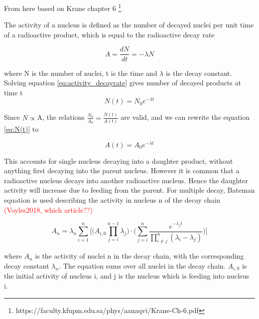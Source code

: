 \documentclass[a4paper,11pt,twoside]{book}
\begin{document}
From here based on Krane chapter 6 \footnote{https://faculty.kfupm.edu.sa/phys/aanaqvi/Krane-Ch-6.pdf}

The activity of a nucleus is defined as the number of decayed nuclei per unit time of a radioactive product, which is equal to the radioactive decay rate 

\begin{equation} \label{eq:activity_decayrate}
   A =  \frac{dN}{dt}=-\lambda N
\end{equation}

where N is the number of nuclei, t is the time and $\lambda$ is the decay constant. Solving equation \ref{eq:activity_decayrate} gives number of decayed products at time t
\begin{equation} \label{eq:N(t)}
    N(t) = N_0 e^{-\lambda t}
\end{equation}

\noindent 
Since $N\propto$A, the relations $\frac{N_0}{A_0}=\frac{N(t)}{A(t)}$ are valid, and we can rewrite the equation \ref{eq:N(t)} to

\begin{equation} \label{eq:activity_decaylaw}
    A(t) = A_0 e^{-\lambda t}
\end{equation}


This accounts for single nucleus decaying into a daughter product, without anything first decaying into the parent nucleus. However it is common that a radioactive nucleus decays into another radioactive nucleus. Hence the daughter activity will increase due to feeding from the parent.
For multiple decay, Bateman equation is used describing the activity in nucleus n of the decay chain \textcolor{red}{(Voyles2018, which article??)}

\begin{equation} \label{eq:ndecay_chains}
    A_n = \lambda_n \sum_{i=1}^n \Big[ \Big( A_{i,0}\prod^{n-1}_{j=i}\lambda_j \Big)\cdot \Big( \sum_{j=i}^n \frac{e^{-\lambda_j t}}{\prod_{i\neq j}^n (\lambda_i - \lambda_j)} \Big) \Big]
\end{equation}

where $A_n$ is the activity of nuclei n in the decay chain, with the corresponding decay constant $\lambda_n$. The equation sums over all nuclei in the decay chain. $A_{i,0}$ is the initial activity of nucleus i, and j is the nucleus which is feeding into nucleus i. 
\end{document}
